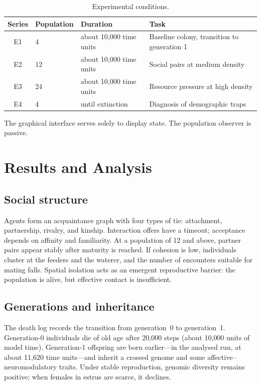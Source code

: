 \documentclass[11pt,a4paper]{article}
\begin{document}
\begin{table}[ht]
\centering
\caption{Experimental conditions.}
\label{tab:conditions}
\begin{tabular}{clll}
\toprule
Series & Population & Duration & Task \\
\midrule
E1 & 4  & about 10{,}000 time units & Baseline colony, transition to generation 1 \\
E2 & 12 & about 10{,}000 time units & Social pairs at medium density \\
E3 & 24 & about 10{,}000 time units & Resource pressure at high density \\
E4 & 4  & until extinction & Diagnosis of demographic traps \\
\bottomrule
\end{tabular}
\end{table}

The graphical interface serves solely to display state. The population observer is passive.

\section{Results and Analysis}

\subsection{Social structure}

Agents form an acquaintance graph with four types of tie: attachment, partnership, rivalry, and kinship. Interaction offers have a timeout; acceptance depends on affinity and familiarity. At a population of 12 and above, partner pairs appear stably after maturity is reached. If cohesion is low, individuals cluster at the feeders and the waterer, and the number of encounters suitable for mating falls. Spatial isolation acts as an emergent reproductive barrier: the population is alive, but effective contact is insufficient.

\subsection{Generations and inheritance}

The death log records the transition from generation~0 to generation~1. Generation-0 individuals die of old age after 20{,}000 steps (about 10{,}000 units of model time). Generation-1 offspring are born earlier---in the analysed run, at about 11{,}620 time units---and inherit a crossed genome and some affective--neuromodulatory traits. Under stable reproduction, genomic diversity remains positive; when females in estrus are scarce, it declines.
\end{document}
